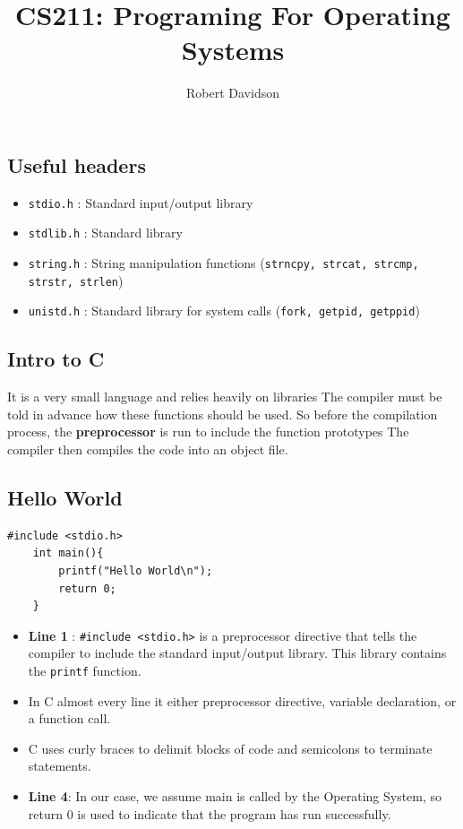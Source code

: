 \documentclass[a4paper, 10pt]{article}
\title{
\textbf{CS211: Programing For Operating Systems} \\ 
}
\author{
Robert Davidson
}
\date{}
\begin{document}
\maketitle
\pagebreak

\tableofcontents
\pagebreak
\subsection*{Useful headers}
\begin{itemize}
    \item \texttt{stdio.h} : Standard input/output library
    \item \texttt{stdlib.h} : Standard library
    \item  \texttt{string.h} : String manipulation functions (\texttt{strncpy, strcat, strcmp, strstr, strlen})
    \item \texttt{unistd.h} : Standard library for system calls (\texttt{fork, getpid, getppid})
\end{itemize}
\pagebreak
\subsection{Intro to C}

It is a very small language and relies heavily on libraries
The compiler must be told in advance how these functions should be used. So before the compilation process, the \textbf{preprocessor} is run to include the function prototypes The compiler then compiles the code into an object file.

\subsection{Hello World}
\begin{lstlisting}[style=cStyle, caption={Hello World in C}]
    #include <stdio.h>
    int main(){
        printf("Hello World\n");
        return 0;
    }
    \end{lstlisting}
\begin{itemize}
    \item \textbf{Line 1} : \texttt{\#include <stdio.h>} is a preprocessor directive that tells the compiler to include the standard input/output library. This library contains the \texttt{printf} function.
    \item In C almost every line it either preprocessor directive, variable declaration, or a function call.
    \item C uses curly braces to delimit blocks of code and semicolons to terminate statements.
    \item \textbf{Line 4}: In our case, we assume main is called by the Operating System, so return 0 is used to indicate that the program has run successfully.
\end{itemize}
\end{document}
